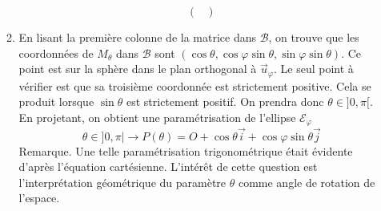 \begin{enumerate}
\begin{enumerate}
\begin{displaymath}
\begin{pmatrix}
\end{pmatrix}
\end{displaymath}
 \item En lisant la première colonne de la matrice dans $\mathcal{B}$, on trouve que les coordonnées de $M_\theta$ dans $\mathcal{B}$ sont $(\cos\theta,\cos\varphi \sin\theta,\sin\varphi \sin\theta)$. Ce point est sur la sphère dans le plan orthogonal à $\overrightarrow{u}_\varphi$. Le seul point à vérifier est que sa troisième coordonnée est strictement positive. Cela se produit lorsque $\sin\theta$ est strictement positif. On prendra donc $\theta\in ]0,\pi[$.\newline
En projetant, on obtient une paramétrisation de l'ellipse $\mathcal{E}_\varphi$
\begin{displaymath}
 \theta\in]0,\pi| \rightarrow P(\theta) = O + \cos\theta \overrightarrow{i} + \cos \varphi\sin\theta \overrightarrow{j} 
\end{displaymath}
Remarque. Une telle paramétrisation trigonométrique était évidente d'après l'équation cartésienne. L'intérêt de cette question est l'interprétation géométrique du paramètre $\theta$ comme angle de rotation de l'espace.
\end{enumerate}
\end{enumerate}
